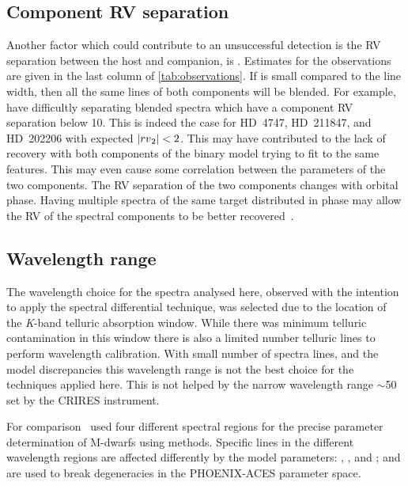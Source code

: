 \subsection{Component {RV} separation}
\label{subsec:rv_seperation}
Another factor which could contribute to an unsuccessful detection is the {RV} separation between the host and companion, is \Rvtwo{}.
Estimates for the observations are given in the last column of \cref{tab:observations}.
If \Rvtwo{} is small compared to the line width, then all the same lines of both components will be blended.
For example, \citet{kolbl_detection_2015} have difficultly separating blended spectra which have a component {RV} separation below 10\kmps{}.
This is indeed the case for {HD~4747}, {HD~211847}, and {HD~202206} with expected \(|{rv{}}_{2}{}| < 2\)\kmps{}.
This may have contributed to the lack of recovery with both components of the binary model trying to fit to the same features.
This may even cause some correlation between the parameters of the two components.
The {RV} separation of the two components changes with orbital phase.
Having multiple spectra of the same target distributed in phase may allow the {RV} of the spectral components to be better recovered~\citep [e.g.][]{czekala_disentangling_2017, sablowski_spectral_2016, piskorz_evidence_2016}.

\subsection {Wavelength range}
\label{subsec:wavelenght_range_limitation}
The wavelength choice for the spectra analysed here, observed with the intention to apply the spectral differential technique, was selected due to the location of the \emph{K}-band telluric absorption window.
While there was minimum telluric contamination in this window there is also a limited number telluric lines to perform wavelength calibration.
With small number of spectra lines, and the model discrepancies this wavelength range is not the best choice for the techniques applied here.
This is not helped by the narrow wavelength range \(\sim\)50\nm{} set by the CRIRES instrument.

For comparison~\citet{passegger_fundamental_2016} used four different spectral regions for the precise parameter determination of M-dwarfs using \textchisquared{} methods.
Specific lines in the different wavelength regions are affected differently by the model parameters: \Teff{}, \Logg{}, and \feh{}; and are used to break degeneracies in the {PHOENIX-ACES} parameter space.

